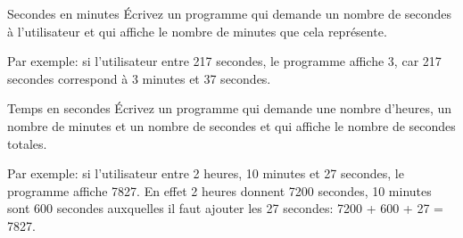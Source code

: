 \documentclass[a4paper,11pt]{article}
\begin{document}
	
	\begin{Exercice}{Secondes en minutes} 
		\'Ecrivez un programme qui demande 
		un nombre de secondes à l'utilisateur
		et qui affiche le nombre de minutes que cela représente.

		Par exemple: 
		si l'utilisateur entre 217 secondes, le programme affiche 3, 
		car 217 secondes correspond à 3 minutes et 37 secondes.
	\end{Exercice}

	\begin{Exercice}{Temps en secondes} 
		\'Ecrivez un programme qui demande 
		une nombre d'heures, un nombre de minutes et un nombre de secondes
		et qui affiche le nombre de secondes totales.
		
		Par exemple: si l'utilisateur entre 2 heures, 10 minutes et 27 secondes, le programme affiche
		7827. En effet 2 heures donnent 7200 secondes, 10 minutes sont 600 secondes 
		auxquelles il faut ajouter les 27 secondes: 7200 + 600 + 27 = 7827. 
	\end{Exercice}

\end{document}
